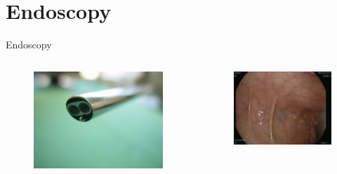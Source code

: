 \section{Endoscopy}

\begin{frame}[c]{Endoscopy}

	\begin{columns}[t, onlytextwidth]
		\begin{column}{0.5\textwidth}

			\begin{figure}
				\includegraphics[width=.9\linewidth]{images/stereo1.jpg}
			\end{figure}
		\end{column}\begin{column}{0.5\textwidth}
			\begin{figure}
				\includegraphics[width=.9\linewidth]{images/sigma.png}
			\end{figure}
		\end{column}
	\end{columns}
\end{frame}


